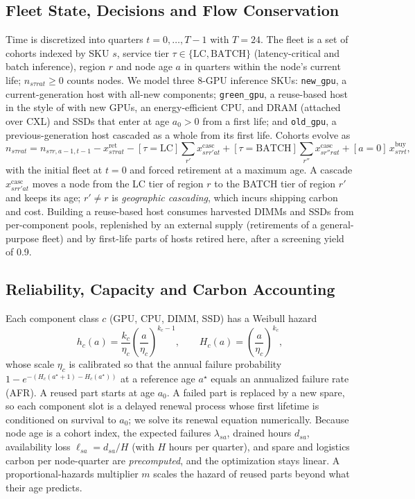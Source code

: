 \documentclass[11pt]{article}
\begin{document}
\subsection{Fleet State, Decisions and Flow Conservation}
Time is discretized into quarters $t=0,\dots,T-1$ with $T=24$. The fleet is a set of cohorts indexed by SKU $s$, service tier $\tau\in\{\text{LC},\text{BATCH}\}$ (latency-critical and batch inference), region $r$ and node age $a$ in quarters within the node's current life; $n_{s\tau rat}\ge 0$ counts nodes. We model three 8-GPU inference SKUs: \texttt{new\_gpu}, a current-generation host with all-new components; \texttt{green\_gpu}, a reuse-based host in the style of \citet{wang2024greensku} with new GPUs, an energy-efficient CPU, and DRAM (attached over CXL) and SSDs that enter at age $a_0>0$ from a first life; and \texttt{old\_gpu}, a previous-generation host cascaded as a whole from its first life. Cohorts evolve as
\begin{equation}
n_{s\tau rat} = n_{s\tau r,a-1,t-1} - x^{\text{ret}}_{s\tau rat} - [\tau{=}\text{LC}]\sum_{r'} x^{\text{casc}}_{srr'at} + [\tau{=}\text{BATCH}]\sum_{r''} x^{\text{casc}}_{sr''rat} + [a{=}0]\,x^{\text{buy}}_{s\tau rt},
\label{eq:flow}
\end{equation}
with the initial fleet at $t=0$ and forced retirement at a maximum age. A cascade $x^{\text{casc}}_{srr'at}$ moves a node from the LC tier of region $r$ to the BATCH tier of region $r'$ and keeps its age; $r'\neq r$ is \emph{geographic cascading}, which incurs shipping carbon and cost. Building a reuse-based host consumes harvested DIMMs and SSDs from per-component pools, replenished by an external supply (retirements of a general-purpose fleet) and by first-life parts of hosts retired here, after a screening yield of 0.9.

\subsection{Reliability, Capacity and Carbon Accounting}
Each component class $c$ (GPU, CPU, DIMM, SSD) has a Weibull hazard
\begin{equation}
h_c(a)=\frac{k_c}{\eta_c}\left(\frac{a}{\eta_c}\right)^{k_c-1},\qquad H_c(a)=\left(\frac{a}{\eta_c}\right)^{k_c},
\label{eq:weibull}
\end{equation}
whose scale $\eta_c$ is calibrated so that the annual failure probability $1-e^{-(H_c(a^\star+1)-H_c(a^\star))}$ at a reference age $a^\star$ equals an annualized failure rate (AFR). A reused part starts at age $a_0$. A failed part is replaced by a new spare, so each component slot is a delayed renewal process whose first lifetime is conditioned on survival to $a_0$; we solve its renewal equation numerically. Because node age is a cohort index, the expected failures $\lambda_{sa}$, drained hours $d_{sa}$, availability loss $\ell_{sa}=d_{sa}/H$ (with $H$ hours per quarter), and spare and logistics carbon per node-quarter are \emph{precomputed}, and the optimization stays linear. A proportional-hazards multiplier $m$ scales the hazard of reused parts beyond what their age predicts.
\end{document}
